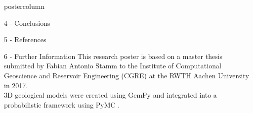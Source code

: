 \documentclass{beamer}
\begin{document}
\begin{frame}
\begin{columns}
\begin{column}{.249\textwidth}
\begin{beamercolorbox}[center]{postercolumn}
\begin{minipage}{.98\textwidth}
{\begin{myblock}{4 - Conclusions}
	


\end{myblock}			
								
					
\begin{myblock}{5 - References}
	\footnotesize
	
\end{myblock}

\begin{myblock}{6 - Further Information}
This research poster is based on a master thesis submitted by Fabian Antonio Stamm to the Institute of Computational Geoscience and Reservoir Engineering (CGRE) at the RWTH Aachen University in 2017. \\
3D geological models were created using GemPy \citep{gmd-2018-61} and integrated into a probabilistic framework using PyMC \citep{salvatier2016pymc3}.
		

			
		



\end{myblock}\vfill		
				
	}\end{minipage}\end{beamercolorbox}
		\end{column}
		
\end{columns}
\end{frame}
\end{document}
